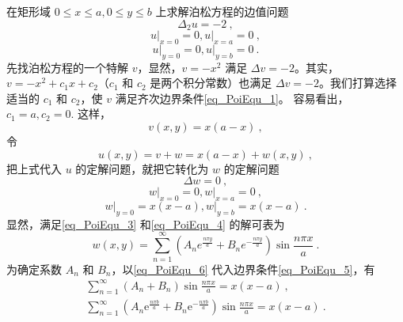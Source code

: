 \begin{example}{}
    在矩形域 $0\leq x\leq a, 0\leq y\leq b$ 上求解泊松方程的边值问题
    \begin{equation}
        \Delta_{2} u=-2~,
    \end{equation}
    \begin{equation} \label{eq_PoiEqu_1}
        \left.u\right|_{x=0}=0,\left.u\right|_{x=a}=0~,
    \end{equation}
    \begin{equation}\label{eq_PoiEqu_2}
        \left.u\right|_{y=0}=0,\left.u\right|_{y=b}=0~.
    \end{equation}
    先找泊松方程的一个特解 $v$，显然，$v=-x^2$ 满足 $\Delta v =-2$。其实，$v=-x^2+c_1x+c_2$（$c_1$ 和 $c_2$ 是两个积分常数）也满足 $\Delta v = -2$。我们打算选择适当的 $c_1$ 和 $c_2$，使 $v$ 满足齐次边界条件\autoref{eq_PoiEqu_1}。 容易看出，$c_1=a,c_2 = 0$.
    这样，
    \begin{equation}
        v(x,y) = x(a-x)~,
    \end{equation}
    令
    \begin{equation}
        u(x,y)=v+w=x(a-x)+w(x,y)~,
    \end{equation}
    把上式代入 $u$ 的定解问题，就把它转化为 $w $ 的定解问题
    \begin{equation} \label{eq_PoiEqu_3}
        \Delta w =0~,
    \end{equation}
    \begin{equation} \label{eq_PoiEqu_4}
        \left.w\right|_{x=0}=0,\left.w\right|_{x=a}=0~,
    \end{equation}
    \begin{equation} \label{eq_PoiEqu_5}
        \left.w\right|_{y=0}=x(x-a),\left.w\right|_{y=b}=x(x-a)~.
    \end{equation}
    显然，满足\autoref{eq_PoiEqu_3} 和\autoref{eq_PoiEqu_4} 的解可表为
    \begin{equation} \label{eq_PoiEqu_6}
        w(x, y)=\sum_{n=1}^{\infty}\left(A_{n} e^{\frac{n \pi y}{a}}+B_{n} e^{-\frac{n \pi y}{a}}\right) \sin \frac{n \pi x}{a}~.
    \end{equation}
    为确定系数 $A_n$ 和 $B_n$，以\autoref{eq_PoiEqu_6} 代入边界条件\autoref{eq_PoiEqu_5}，有
    \begin{equation}  \label{eq_PoiEqu_7}
        \begin{array}{l}\sum_{n=1}^{\infty}\left(A_{n}+B_{n}\right) \sin \frac{n \pi x}{a}=x(x-a)~, \\ \sum_{n=1}^{\infty}\left(A_{n} \mathrm{e}^{\frac{n \pi b}{a}}+B_{n} \mathrm{e}^{-\frac{n \pi b}{a}}\right) \sin \frac{n \pi x}{a}=x(x-a)~.\end{array}

\end{equation}
\end{example}
